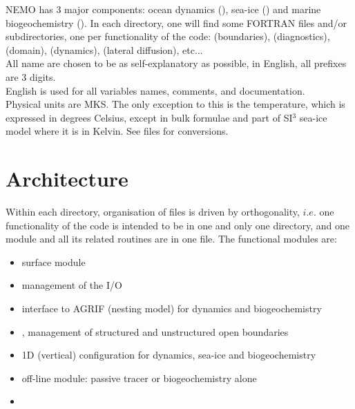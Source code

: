 \documentclass{article}
\begin{document}
NEMO has 3 major components: ocean dynamics (), sea-ice () and
marine biogeochemistry ().
In each directory, one will find some FORTRAN files and/or subdirectories, one per functionality of the code:
 (boundaries),  (diagnostics),  (domain),
 (dynamics),  (lateral diffusion), etc... \\
All name are chosen to be as self-explanatory as possible, in English, all prefixes are 3 digits. \\
English is used for all variables names, comments, and documentation. \\
Physical units are MKS. The only exception to this is the temperature, which is expressed in degrees Celsius,
except in bulk formulae and part of SI$^3$ sea-ice model where it is in Kelvin.
See  files for conversions.

\section{Architecture}

Within each directory, organisation of files is driven by orthogonality,
$i.e.$ one functionality of the code is intended to be in one and only one directory, and
one module and all its related routines are in one file.
The functional modules are:

\begin{itemize}
\item {}             surface module
\item {}             management of the I/O
\item {}             interface to AGRIF (nesting model) for dynamics and biogeochemistry
\item {},  management of structured and unstructured open boundaries 
\item {}             1D (vertical) configuration for dynamics, sea-ice and biogeochemistry
\item {}             off-line module: passive tracer or biogeochemistry alone
\item {}
\end{itemize}
\end{document}
